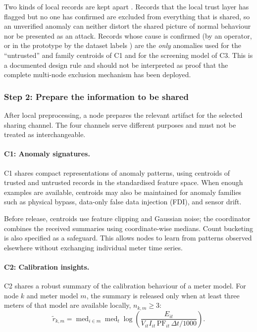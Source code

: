Two kinds of local records are kept apart \design{}. Records that the
local trust layer has flagged but no one has confirmed are excluded from
everything that is shared, so an unverified anomaly can neither distort
the shared picture of normal behaviour nor be presented as an attack.
Records whose cause is confirmed (by an operator, or in the prototype by
the dataset labels ) are the \emph{only} anomalies used for
the ``untrusted'' and family centroids of C1 and for the screening model
of C3. This is a documented design rule and should not be interpreted as
proof that the complete multi-node exclusion mechanism has been deployed.

\subsubsection{Step 2: Prepare the information to be shared}

After local preprocessing, a node prepares the relevant artifact for
the selected sharing channel. The four channels serve different
purposes and must not be treated as interchangeable.

\paragraph{C1: Anomaly signatures.}

C1 shares compact representations of anomaly patterns, using centroids
of trusted and untrusted records in the standardised feature space.
When enough examples are available, centroids may also be maintained
for anomaly families such as physical bypass, data-only false data
injection (FDI), and sensor drift.

Before release, centroids use feature clipping and Gaussian noise;
the coordinator combines the received summaries using coordinate-wise
medians. Count bucketing is also specified as a safeguard. This allows
nodes to learn from patterns observed elsewhere without exchanging
individual meter time series.

\paragraph{C2: Calibration insights.}

C2 shares a robust summary of the calibration behaviour of a meter
model. For node $k$ and meter model $m$, the summary is released only
when at least three meters of that model are available locally,
$n_{k,m}\geq 3$:
\begin{equation}
\widetilde r_{k,m}
=
\operatorname{med}_{i\in m}
\operatorname{med}_{t}
\log\!\left(
\frac{E_{it}}
{V_{it} I_{it}\,\mathrm{PF}_{it}\,\Delta t/1000}
\right).
\label{g4-eq:protocol-calibration-local}
\end{equation}

